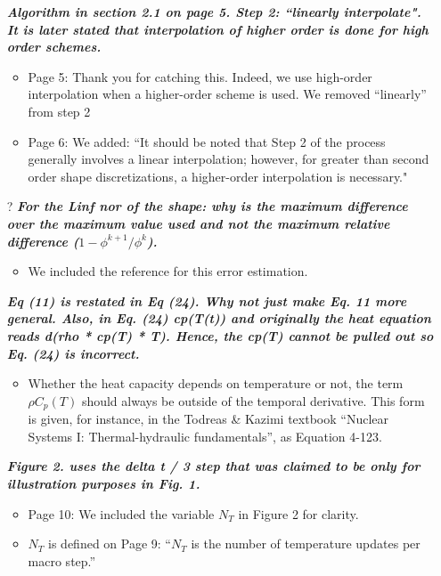 \documentclass{elsarticle}
\newcommand{\nofix}{?}
\newcommand{\done}{\checkmark}
\newcommand{\easy}[1]{\textbf{\textit{#1}}}
\newcommand{\medm}[1]{\textbf{\textit{#1}}}
\begin{document}
\begin{itemize}
\item[\done] \easy{ Algorithm in section 2.1 on page 5. Step 2: ``linearly interpolate". It is later stated that interpolation of higher order is done for high order schemes. }
\begin{itemize}
\item Page 5: Thank you for catching this. Indeed, we use high-order interpolation when a higher-order scheme is used. We removed ``linearly'' from step 2
\item Page 6: We added: ``It should be noted that Step 2 of the process generally involves a linear interpolation; however, for greater than second order shape discretizations, a higher-order interpolation is necessary."
\end{itemize}

\item[\nofix] \easy{ For the Linf nor of the shape: why is the maximum difference over the maximum value used and not the maximum relative difference ($1 - \phi^{k+1}/\phi^k$). }
\begin{itemize}
\item We included the reference for this error estimation.
\end{itemize}

\item[\done] \medm{ Eq (11) is restated in Eq (24). Why not just make Eq. 11 more general. Also, in Eq. (24) cp(T(t)) and originally the heat equation reads d(rho * cp(T) * T). Hence, the cp(T) cannot be pulled out so Eq. (24) is incorrect. }
\begin{itemize}
\item Whether the heat capacity depends on temperature or not, the term  $\rho C_p(T)$ should always be outside of the temporal derivative. This form is given, for instance, in the Todreas \& Kazimi textbook ``Nuclear Systems I: Thermal-hydraulic fundamentals'', as Equation 4-123.
\end{itemize}

\item[\done] \easy{ Figure 2. uses the delta t / 3 step that was claimed to be only for illustration purposes in Fig. 1. }
\begin{itemize}
\item Page 10: We included the variable $N_{T}$ in Figure 2 for clarity.
\item $N_T$ is defined on Page 9: ``$N_T$ is the number of temperature updates per macro step.''
\end{itemize}


\end{itemize}
\end{document}
